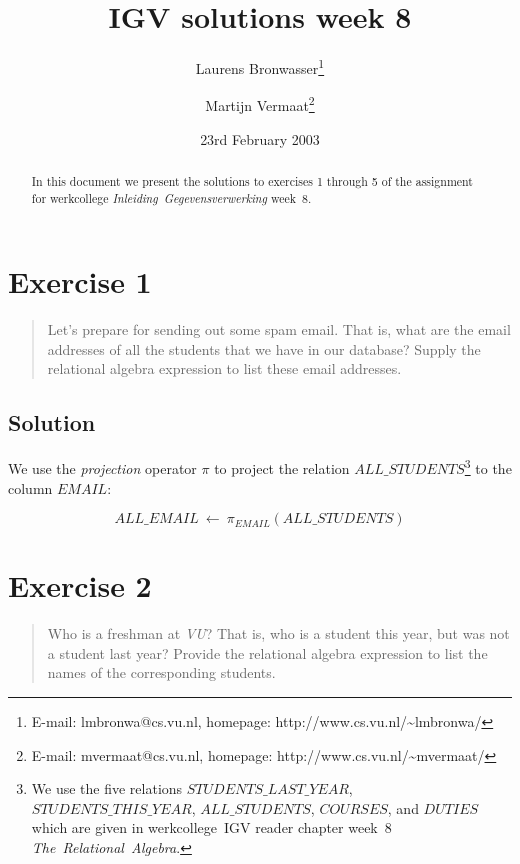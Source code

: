 \documentclass[11pt]{article}
\title{IGV solutions week 8}
\author{
	Laurens Bronwasser\footnote{E-mail: lmbronwa@cs.vu.nl, homepage: http://www.cs.vu.nl/\~{}lmbronwa/}
	\and
	Martijn Vermaat\footnote{E-mail: mvermaat@cs.vu.nl, homepage: http://www.cs.vu.nl/\~{}mvermaat/}
}
\date{23rd February 2003}
\begin{document}
\maketitle

\begin{abstract}
In this document we present the solutions to exercises 1 through 5 of the assignment for werkcollege \emph{\mbox{Inleiding Gegevensverwerking}} \mbox{week 8}.
\end{abstract}

\tableofcontents


\newpage

\section{Exercise 1}

\begin{quote}
Let's prepare for sending out some spam email. That is, what are the email addresses of all the students that we have in our database? Supply the relational algebra expression to list these email addresses.
\end{quote}

\subsection*{Solution}

We use the \emph{projection} operator $\pi$ to project the relation $ALL\_STUDENTS$\footnote{We use the five relations $STUDENTS\_LAST\_YEAR$, $STUDENTS\_THIS\_YEAR$, $ALL\_STUDENTS$, $COURSES$, and $DUTIES$ which are given in \mbox{werkcollege IGV} reader chapter \mbox{week 8} \emph{\mbox{The Relational Algebra}}.} to the column $EMAIL$:

\begin{displaymath}
ALL\_EMAIL \ \gets \ \pi_{EMAIL}(ALL\_STUDENTS)
\end{displaymath}


\newpage

\section{Exercise 2}

\begin{quote}
Who is a freshman at \emph{VU}? That is, who is a student this year, but was not a student last year? Provide the relational algebra expression to list the names of the corresponding students.
\end{quote}
\end{document}
